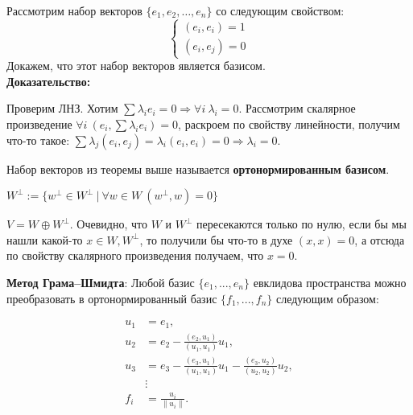\documentclass[12pt]{article}
\begin{document}
\begin{theorembox}
    Рассмотрим набор векторов $\{e_1, e_2, \dots,e_n\}$ со следующим свойством:
    \[
        \begin{cases}
        (e_i, e_i) = 1\\
        (e_i, e_j) = 0
        \end{cases}
    \]
    Докажем, что этот набор векторов является базисом.\\

    \textbf{Доказательство:}

    Проверим ЛНЗ. Хотим $\sum \lambda_i e_i = 0 \Rightarrow \forall i \ \lambda_i = 0$. Рассмотрим скалярное произведение $\forall i \ (e_i, \sum \lambda_i e_i) =0 $, раскроем по свойству линейности, получим что-то такое: $\sum \lambda_j (e_i, e_j) = \lambda_i (e_i, e_i) = 0 \Rightarrow \lambda_i = 0$.
    
\end{theorembox}

\begin{definitionbox}
    Набор векторов из теоремы выше называется \textbf{ортонормированным базисом}.
\end{definitionbox}

\begin{definitionbox}
    $W^\perp := \{w^\perp \in W^\perp \ | \ \forall w \in W \ (w^\perp, w) = 0\}$
\end{definitionbox}

\begin{remarkbox}
    $V = W \oplus W^\perp$. Очевидно, что $W$ и $W^\perp$ пересекаются только по нулю, если бы мы нашли какой-то $x \in W, W^\perp$, то получили бы что-то в духе $(x, x) = 0$, а отсюда по свойству скалярного произведения получаем, что $x = 0$.
\end{remarkbox}

\begin{theorembox}
    \textbf{Метод Грама–Шмидта}: Любой базис $ \{e_1, ..., e_n\} $ евклидова пространства можно преобразовать в ортонормированный базис $ \{f_1, ..., f_n\} $ следующим образом:

    \begin{align*}
    u_1 &= e_1, \\
    u_2 &= e_2 - \frac{(e_2, u_1)}{(u_1, u_1)} u_1, \\
    u_3 &= e_3 - \frac{(e_3, u_1)}{(u_1, u_1)} u_1 - \frac{(e_3, u_2)}{(u_2, u_2)} u_2, \\
    &\vdots \\
    f_i &= \frac{u_i}{\|u_i\|}.
    \end{align*}
\end{theorembox}
\end{document}

